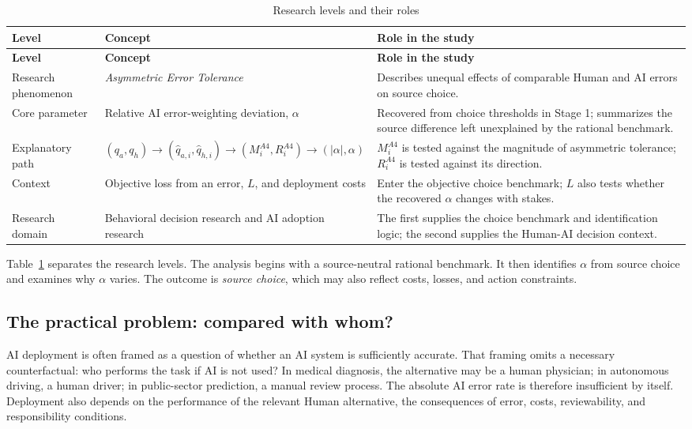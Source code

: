 \documentclass[11pt,a4paper]{article}
\newcommand{\term}[1]{\textit{#1}}
\begin{document}
\begin{longtable}{>{\RaggedRight\arraybackslash}p{}>{\RaggedRight\arraybackslash}p{}>{\RaggedRight\arraybackslash}p{}}
\caption{Research levels and their roles}\label{tab:research_levels}\\
\toprule
\textbf{Level} & \textbf{Concept} & \textbf{Role in the study}\\
\midrule
\endfirsthead
\toprule
\textbf{Level} & \textbf{Concept} & \textbf{Role in the study}\\
\midrule
\endhead
Research phenomenon & \term{Asymmetric Error Tolerance} & Describes unequal effects of comparable Human and AI errors on source choice.\\
Core parameter & Relative AI error-weighting deviation, $\alpha$ & Recovered from choice thresholds in Stage 1; summarizes the source difference left unexplained by the rational benchmark.\\
Explanatory path & $(q_a,q_h)\rightarrow(\widehat q_{a,i},\widehat q_{h,i})\rightarrow(M_i^{A4},R_i^{A4})\rightarrow(|\alpha|,\alpha)$ & $M_i^{A4}$ is tested against the magnitude of asymmetric tolerance; $R_i^{A4}$ is tested against its direction.\\
Context & Objective loss from an error, $L$, and deployment costs & Enter the objective choice benchmark; $L$ also tests whether the recovered $\alpha$ changes with stakes.\\
Research domain & Behavioral decision research and AI adoption research & The first supplies the choice benchmark and identification logic; the second supplies the Human-AI decision context.\\
\bottomrule
\end{longtable}

Table~\ref{tab:research_levels} separates the research levels. The analysis begins with a source-neutral rational benchmark. It then identifies $\alpha$ from source choice and examines why $\alpha$ varies. The outcome is \term{source choice}, which may also reflect costs, losses, and action constraints.

\subsection{The practical problem: compared with whom?}

AI deployment is often framed as a question of whether an AI system is sufficiently accurate. That framing omits a necessary counterfactual: who performs the task if AI is not used? In medical diagnosis, the alternative may be a human physician; in autonomous driving, a human driver; in public-sector prediction, a manual review process. The absolute AI error rate is therefore insufficient by itself. Deployment also depends on the performance of the relevant Human alternative, the consequences of error, costs, reviewability, and responsibility conditions.
\end{document}
